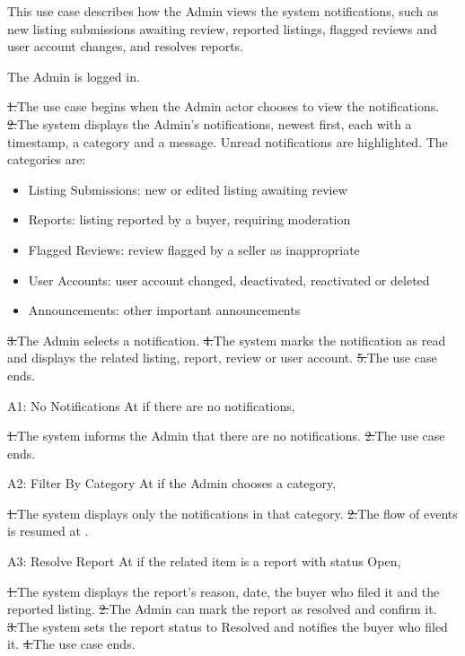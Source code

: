 This use case describes how the Admin views the system notifications, such as new listing submissions awaiting review, reported listings, flagged reviews and user account changes, and resolves reports.\par
{}
The Admin is logged in.\par
{}
\st{1.}{The use case begins when the Admin actor chooses to view the notifications.}
\st{2.}{The system displays the Admin's notifications, newest first, each with a timestamp, a category and a message. Unread notifications are highlighted. The categories are:}
\begin{itemize}
  \item Listing Submissions: new or edited listing awaiting review
  \item Reports: listing reported by a buyer, requiring moderation
  \item Flagged Reviews: review flagged by a seller as inappropriate
  \item User Accounts: user account changed, deactivated, reactivated or deleted
  \item Announcements: other important announcements
\end{itemize}
\st{3.}{The Admin selects a notification.}
\st{4.}{The system marks the notification as read and displays the related listing, report, review or user account.}
\st{5.}{The use case ends.}
\begin{flowblock}{A1: No Notifications}
At  if there are no notifications,\par
\st{1.}{The system informs the Admin that there are no notifications.}
\st{2.}{The use case ends.}
\end{flowblock}
\begin{flowblock}{A2: Filter By Category}
At  if the Admin chooses a category,\par
\st{1.}{The system displays only the notifications in that category.}
\st{2.}{The flow of events is resumed at .}
\end{flowblock}
\begin{flowblock}{A3: Resolve Report}
At  if the related item is a report with status Open,\par
\st{1.}{The system displays the report's reason, date, the buyer who filed it and the reported listing.}
\st{2.}{The Admin can mark the report as resolved and confirm it.}
\st{3.}{The system sets the report status to Resolved and notifies the buyer who filed it.}
\st{4.}{The use case ends.}
\end{flowblock}
